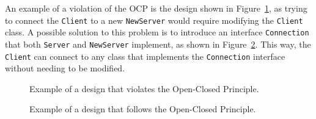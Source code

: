 An example of a violation of the OCP is the design shown in Figure~\ref{fig:ocp-violation}, as trying to connect the \texttt{Client} to a new \texttt{NewServer} would require modifying the \texttt{Client} class. A possible solution to this problem is to introduce an interface \texttt{Connection} that both \texttt{Server} and \texttt{NewServer} implement, as shown in Figure~\ref{fig:ocp-follow}. This way, the \texttt{Client} can connect to any class that implements the \texttt{Connection} interface without needing to be modified.
\begin{figure}
    \centering
    \caption{Example of a design that violates the Open-Closed Principle.}
    \label{fig:ocp-violation}
\end{figure}

\begin{figure}
    \centering
    \caption{Example of a design that follows the Open-Closed Principle.}
    \label{fig:ocp-follow}
\end{figure}


